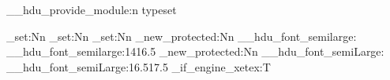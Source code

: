 \__hdu_provide_module:n {typeset}
\RequirePackage { circuitikz, pgfplots, listings, hologo,
                  lipsum,     zhlipsum, booktabs, multicol }
\pgfplotsset { compat = newest }
\graphicspath
  {
    {./figure/}   {./figures/} {./image/}    {./images/}
    {./graphics/} {./graphic/} {./pictures/} {./picture/}
  }
\linespread{1.389}  %
\AtBeginDocument
  {
    \dim_set:Nn \abovedisplayskip {3pt}
    \dim_set:Nn \belowdisplayskip {3pt}
    \dim_set:Nn \parindent { 2\ccwd }
  }
\RequirePackage { mathtools,  amssymb, cancel,  fixdif,
                  derivative, siunitx, physics2, bm }
\cs_new_protected:Nn \__hdu_font_semilarge:
  { \@setfontsize \__hdu_font_semilarge:{14}{16.5} }
\cs_new_protected:Nn \__hdu_font_semiLarge:
  { \@setfontsize \__hdu_font_semiLarge:{16.5}{17.5} }
\sys_if_engine_xetex:T
